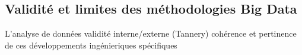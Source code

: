 \subsection[Validité et limites des méthodologies Big Data]{Validité et limites des méthodologies Big Data}



L'analyse de données
validité interne/externe (Tannery)
cohérence et pertinence de ces développements ingénieriques spécifiques

 




